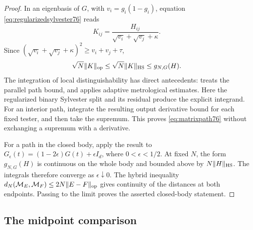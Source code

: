 \begin{proof}
In an eigenbasis of $G$, with $v_i=g_i(1-g_i)$, equation
\eqref{eq:regularizedsylvester76} reads
\[
 K_{ij}=\frac{H_{ij}}{\sqrt{v_i}+\sqrt{v_j}+\kappa}.
\]
Since $(\sqrt{v_i}+\sqrt{v_j}+\kappa)^2\ge v_i+v_j+\tau$,
\begin{equation}\label{eq:regularizedformbound76}
 \sqrt N\|K\|_{\rm op}
 \le\sqrt N\|K\|_{\rm HS}
 \le g_{N,G}(H).
\end{equation}
The integration of local distinguishability has direct antecedents:
\cite[Section~III, equation~(26), PDF version~3]{YF76} treats the
parallel path bound, and
\cite[Section~IV.A, equations~(14)--(22)]{SD76} applies adaptive
metrological estimates. Here the regularized binary Sylvester split
and its residual produce the explicit integrand.
For an interior path, integrate the resulting output derivative
bound for each fixed tester, and then take the supremum.  This
proves \eqref{eq:matrixpath76} without exchanging a supremum
with a derivative.

For a path in the closed body, apply the result to
$G_\epsilon(t)=(1-2\epsilon)G(t)+\epsilon I_d$, where
$0<\epsilon<1/2$.  At fixed $N$, the form
$g_{N,G}(H)$ is continuous on the whole body and bounded above
by $N\|H\|_{\rm HS}$.  The integrals therefore converge as
$\epsilon\downarrow0$.  The hybrid inequality
$d_N(\mathcal M_E,\mathcal M_F)\le2N\|E-F\|_{\rm op}$
gives continuity of the distances at both endpoints.  Passing to
the limit proves the asserted closed-body statement.
\end{proof}

\subsection{The midpoint comparison}

